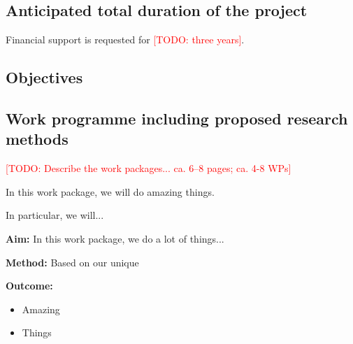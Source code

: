 \documentclass[american,firsttime]{dfgproposal}
\newcommand{\todo}[1]{\xspace{\textcolor{red}{[TODO: #1]}}\xspace}
\begin{document}
	\subsection{Anticipated total duration of the project}
	Financial support is requested for \todo{three years}.
	
	\subsection{Objectives}
	
	\subsection{Work programme including proposed research methods}
	\todo{Describe the work packages... ca. 6--8 pages; ca. 4-8 WPs}
	
	\begin{workpackage}
		In this work package, we will do amazing things.
		
		In particular, we will...
		\blindtext
	\end{workpackage}
	\begin{wpsummary}
		\textbf{Aim:}
		In this work package, we do a lot of things...
		
		\textbf{Method:}
		Based on our unique 
		
		\textbf{Outcome:}
		\begin{itemize}
			\item Amazing
			\item Things
		\end{itemize}
	\end{wpsummary}
	
\end{document}
